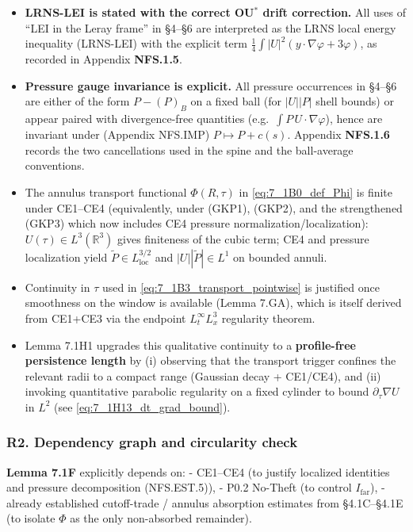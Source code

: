 \documentclass[
  11pt,
]{article}
\begin{document}
\begin{itemize}
\item
  \textbf{LRNS-LEI is stated with the correct OU\(^\ast\) drift correction.} All uses of ``LEI in the Leray frame'' in §4--§6 are interpreted as the LRNS local energy inequality (LRNS-LEI) with the explicit term \(\tfrac14\int |U|^2(y\cdot\nabla\varphi+3\varphi)\), as recorded in Appendix \textbf{NFS.1.5}.
\item
  \textbf{Pressure gauge invariance is explicit.} All pressure occurrences in §4--§6 are either of the form \(P-(P)_B\) on a fixed ball (for \(|U||P|\) shell bounds) or appear paired with divergence-free quantities (e.g.~\(\int P\,U\cdot\nabla\varphi\)), hence are invariant under (Appendix NFS.IMP) \(P\mapsto P+c(s)\). Appendix \textbf{NFS.1.6} records the two cancellations used in the spine and the ball-average conventions.
\item
  The annulus transport functional \(\Phi(R,\tau)\) in \eqref{eq:7_1B0_def_Phi} is finite under CE1--CE4 (equivalently, under (GKP1), (GKP2), and the strengthened (GKP3) which now includes CE4 pressure normalization/localization): \(U(\tau)\in L^3(\mathbb R^3)\) gives finiteness of the cubic term; CE4 and pressure localization yield \(\widetilde P\in L^{3/2}_{\mathrm{loc}}\) and \(|U||\widetilde P|\in L^1\) on bounded annuli.
\item
  Continuity in \(\tau\) used in \eqref{eq:7_1B3_transport_pointwise} is justified once smoothness on the window is available (Lemma 7.GA), which is itself derived from CE1+CE3 via the endpoint \(L^\infty_tL^3_x\) regularity theorem.
\item
  Lemma 7.1H1 upgrades this qualitative continuity to a \textbf{profile-free persistence length} by (i) observing that the transport trigger confines the relevant radii to a compact range (Gaussian decay + CE1/CE4), and (ii) invoking quantitative parabolic regularity on a fixed cylinder to bound \(\partial_\tau\nabla U\) in \(L^2\) (see \eqref{eq:7_1H13_dt_grad_bound}).
\end{itemize}

\hypertarget{r2.-dependency-graph-and-circularity-check}{%
\subsubsection{R2. Dependency graph and circularity check}\label{r2.-dependency-graph-and-circularity-check}}

\textbf{Lemma 7.1F} explicitly depends on: - CE1--CE4 (to justify localized identities and pressure decomposition (NFS.EST.5)), - P0.2 No-Theft (to control \(I_{\mathrm{far}}\)), - already established cutoff-trade / annulus absorption estimates from §4.1C--§4.1E (to isolate \(\Phi\) as the only non-absorbed remainder).
\end{document}
